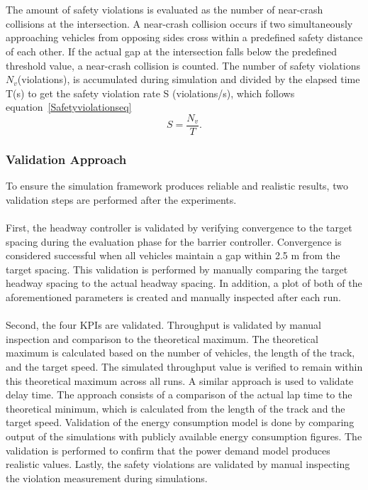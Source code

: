 \\\\
The amount of safety violations is evaluated as the number of near-crash collisions at the intersection. A near-crash collision occurs if two simultaneously approaching vehicles from opposing sides cross within a predefined safety distance of each other. If the actual gap at the intersection falls below the predefined threshold value, a near-crash collision is counted.  The number of safety violations \(N_v\)(violations), is accumulated during simulation and divided by the elapsed time T(s) to get the safety violation rate S (violations/s), which follows equation~\ref{Safetyviolationseq}
\begin{equation}
\label{Safetyviolationseq}
       S = \frac{ N_v}{T}.
\end{equation}




\subsubsection{Validation Approach}
\label{System Validation}
To ensure the simulation framework produces reliable and realistic results, two validation steps are performed after the experiments.
\\\\
First, the headway controller is validated by verifying convergence to the target spacing during the evaluation phase for the barrier controller. Convergence is considered successful when all vehicles maintain a gap within 2.5 m from the target spacing. This validation is performed by manually comparing the target headway spacing to the actual headway spacing. In addition, a plot of both of the aforementioned parameters is created and manually inspected after each run.    
\\\\
Second, the four KPIs are validated. Throughput is validated by manual inspection and comparison to the theoretical maximum. The theoretical maximum is calculated based on the number of vehicles, the length of the track, and the target speed. The simulated throughput value is verified to remain within this theoretical maximum across all runs. A similar approach is used to validate delay time. The approach consists of a comparison of the actual lap time to the theoretical minimum, which is calculated from the length of the track and the target speed. Validation of the energy consumption model is done by comparing output of the simulations with publicly available energy consumption figures. The validation is performed to confirm that the power demand model produces realistic values. Lastly, the safety violations are validated by manual inspecting the violation measurement during simulations. 
\\\\








